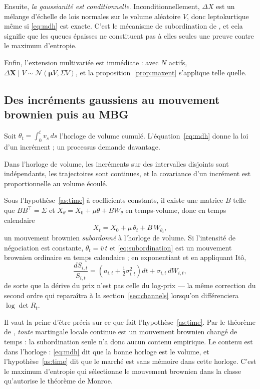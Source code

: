 Ensuite, \emph{la gaussianité est conditionnelle}. Inconditionnellement,
$\Delta X$ est un mélange d'échelle de lois normales sur le volume aléatoire $V$,
donc leptokurtique même si \eqref{eq:mdh} est exacte. C'est le mécanisme de
subordination de \citet{mandelbrot1967}, et cela signifie que les queues épaisses
ne constituent pas à elles seules une preuve contre le maximum d'entropie.

Enfin, l'extension multivariée est immédiate : avec $N$ actifs,
$\Delta \mathbf{X}\mid V \sim \mathcal N(\boldsymbol\mu V, \Sigma V)$, et la
proposition~\ref{prop:maxent} s'applique telle quelle.

\subsection{Des incréments gaussiens au mouvement brownien puis au MBG}

Soit $\theta_t=\int_0^t v_s\,ds$ l'horloge de volume cumulé.
L'équation~\eqref{eq:mdh} donne la loi d'un incrément ; un processus demande
davantage.

\begin{assumption}\label{as:time}
Dans l'horloge de volume, les incréments sur des intervalles disjoints sont
indépendants, les trajectoires sont continues, et la covariance d'un incrément
est proportionnelle au volume écoulé.
\end{assumption}

Sous l'hypothèse~\ref{as:time} à coefficients constants, il existe une matrice
$B$ telle que $BB^{\!\top}=\Sigma$ et $X_\theta = X_0 + \mu\theta + BW_\theta$ en
temps-volume, donc en temps calendaire
\begin{equation}
\label{eq:subordination}
X_t = X_0 + \mu\,\theta_t + B\,W_{\theta_t},
\end{equation}
un mouvement brownien \emph{subordonné} à l'horloge de volume. Si l'intensité de
négociation est constante, $\theta_t=\bar v\,t$ et \eqref{eq:subordination} est
un mouvement brownien ordinaire en temps calendaire ; en exponentiant et en
appliquant Itô,
\begin{equation}
\frac{dS_{i,t}}{S_{i,t}} = \left(a_{i,t}+\tfrac12\sigma_{i,t}^2\right)dt + \sigma_{i,t}\,dW_{i,t},
\end{equation}
de sorte que la dérive du prix n'est pas celle du log-prix --- la même correction
du second ordre qui reparaîtra à la section~\ref{sec:channels} lorsqu'on
différenciera $\log\det R_t$.

Il vaut la peine d'être précis sur ce que fait l'hypothèse~\ref{as:time}. Par le
théorème de \citet{monroe1978}, \emph{toute} martingale locale continue est un
mouvement brownien changé de temps : la subordination seule n'a donc aucun
contenu empirique. Le contenu est dans l'horloge : \eqref{eq:mdh} dit que la
bonne horloge est le volume, et l'hypothèse~\ref{as:time} dit que le marché est
sans mémoire dans cette horloge. C'est le maximum d'entropie qui sélectionne le
mouvement brownien dans la classe qu'autorise le théorème de Monroe.

